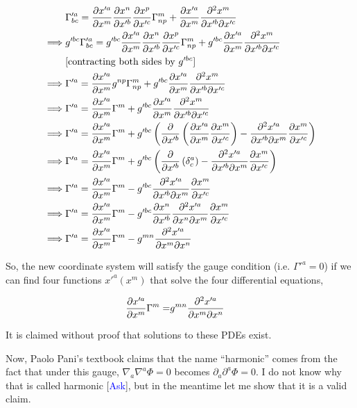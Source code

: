 \begin{align*}
    &\Gamma'^a_{bc} = \frac{\partial x'^a}{\partial x^m} \frac{\partial x^n}{\partial x'^b} \frac{\partial x^p}{\partial x'^c} \Gamma^{m}_{np}+ \frac{\partial x'^a}{\partial x^m}\frac{\partial^2 x^m}{\partial x'^b \partial x'^c}\\
     \implies& g'^{bc}\Gamma'^a_{bc} = g'^{bc}\frac{\partial x'^a}{\partial x^m} \frac{\partial x^n}{\partial x'^b} \frac{\partial x^p}{\partial x'^c} \Gamma^{m}_{np}+ g'^{bc}\frac{\partial x'^a}{\partial x^m}\frac{\partial^2 x^m}{\partial x'^b \partial x'^c}\\
    &\text{[contracting both sides by $g'^{bc}$]}\\
    \implies & \Gamma'^a = \frac{\partial x'^a}{\partial x^m}g^{np} \Gamma^m_{np}+g'^{bc}\frac{\partial x'^a}{\partial x^m}\frac{\partial^2 x^m}{\partial x'^b \partial x'^c}\\
    \implies & \Gamma'^a = \frac{\partial x'^a}{\partial x^m} \Gamma^m+g'^{bc}\frac{\partial x'^a}{\partial x^m}\frac{\partial^2 x^m}{\partial x'^b \partial x'^c}\\
    \implies & \Gamma'^a = \frac{\partial x'^a}{\partial x^m} \Gamma^m+g'^{bc} \left( \frac{\partial}{\partial x'^b}\left( \frac{\partial x'^a}{\partial x^m}\frac{\partial x^m}{\partial x'^c} \right)-\frac{\partial^2 x'^a}{\partial x'^b \partial x^m}\frac{\partial x^m}{\partial x'^c} \right)\\
    \implies & \Gamma'^a = \frac{\partial x'^a}{\partial x^m} \Gamma^m+g'^{bc} \left( \frac{\partial}{\partial x'^b}\left( \delta^a_c \right)-\frac{\partial^2 x'^a}{\partial x'^b \partial x^m}\frac{\partial x^m}{\partial x'^c} \right)\\
    \implies & \Gamma'^a = \frac{\partial x'^a}{\partial x^m} \Gamma^m-g'^{bc}\frac{\partial^2 x'^a}{\partial x'^b \partial x^m}\frac{\partial x^m}{\partial x'^c}\\
    \implies& \Gamma'^a = \frac{\partial x'^a}{\partial x^m}\Gamma^m - g'^{bc} \frac{\partial x^n}{\partial x'^b} \frac{\partial^2 x'^a}{\partial x^n \partial x^m} \frac{\partial x^m}{\partial x'^c}\\
     \implies& \Gamma'^a = \frac{\partial x'^a}{\partial x^m}\Gamma^m - g^{mn} \frac{\partial^2 x'^a}{\partial x^m \partial x^n}
\end{align*}

So, the new coordinate system will satisfy the gauge condition (i.e. $\Gamma'^a=0 $) if we can find four functions $x'^a(x^m)$ that solve the four differential equations,

\begin{align*}
    \frac{\partial x'^a}{\partial x^m}\Gamma^m =& g^{mn} \frac{\partial^2 x'^a}{\partial x^m \partial x^n}
\end{align*}

It is claimed without proof that solutions to these PDEs exist. 

Now, Paolo Pani's textbook claims that the name ``harmonic'' comes from the fact that under this gauge, $\nabla_a\nabla^a \Phi=0$ becomes $\partial_a \partial^a \Phi=0$. I do not know why that is called harmonic [\textcolor{blue}{Ask}], but in the meantime let me show that it is a valid claim.

